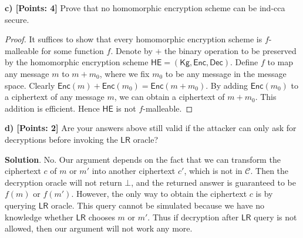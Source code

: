 \documentclass[12pt]{article}
\theoremstyle{definition}
\newcommand{\Kg}{\textsf{Kg}}
\newcommand{\Enc}{\textsf{Enc}}
\newcommand{\Dec}{\textsf{Dec}}
\newcommand{\LR}{\textsf{LR}}
\begin{document}
\newcommand{\HE}{\textsf{HE}}
{\bf c) [Points: 4]} Prove that no homomorphic encryption scheme can be ind-cca secure.
\begin{proof}
It suffices to show that every homomorphic encryption scheme is $f$-malleable for some function $f$.
Denote by $+$ the binary operation to be preserved by the homomorphic encryption scheme $\HE = (\Kg, \Enc, \Dec)$. Define $f$ to map any message $m$ to $m+m_0$, where we fix $m_0$ to be any message in the message space. Clearly $\Enc(m)+\Enc(m_0) = \Enc(m+m_0)$. By adding $\Enc(m_0)$ to a ciphertext of any message $m$, we can obtain a ciphertext of $m+m_0$. This addition is efficient. Hence $\HE$ is not $f$-malleable.
\end{proof}

{\bf d) [Points: 2]} Are your answers above still valid if the attacker can only ask for decryptions
before invoking the $\LR$ oracle?

{\bf Solution}. No. Our argument depends on the fact that we can transform the ciphertext $c$ of $m$ or $m'$ into another ciphertext $c'$, which is not in $\mathcal{C}$.
Then the decryption oracle will not return $\bot$, and the returned answer is guaranteed to be $f(m)$ or $f(m')$. 
However, the only way to obtain the ciphertext $c$ is by querying $\LR$ oracle. This query cannot be simulated because we have no knowledge whether $\LR$ chooses $m$ or $m'$. Thus if decryption after $\LR$ query is not allowed, then our argument will not work any more.

\newcommand{\D}{\mathcal{D}}
\newcommand{\G}{\mathbb{G}}
\newcommand{\NP}{\mathcal{NP}}
\newcommand{\ddh}{\textsf{ddh}}
\end{document}
